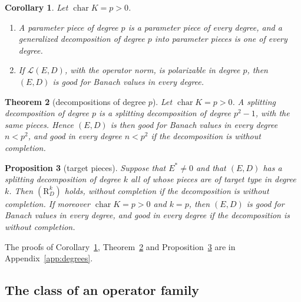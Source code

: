\documentclass[11pt]{amsart}
\newtheorem{theorem}{Theorem}[section]
\newtheorem{proposition}[theorem]{Proposition}
\newtheorem{corollary}[theorem]{Corollary}
\theoremstyle{definition}
\theoremstyle{remark}
\numberwithin{equation}{section}
\newcommand{\cL}{\mathcal L}
\theoremstyle{plain}
\theoremstyle{definition}
\theoremstyle{plain}
\begin{document}
\begin{corollary}\label{cmb:cor:parameter-degrees}
Let $\operatorname{char}K=p>0$.
\begin{enumerate}
\item A parameter piece of degree $p$ is a parameter piece of every degree, and a generalized decomposition of degree $p$
into parameter pieces is one of every degree.
\item If $\cL(E,D)$, with the operator norm, is polarizable in degree $p$, then $(E,D)$ is good for Banach values in every
degree.
\end{enumerate}
\end{corollary}

\begin{theorem}[decompositions of degree $p$]\label{cmb:thm:mixed-degrees}
Let $\operatorname{char}K=p>0$. A splitting decomposition of degree $p$ is a splitting decomposition of degree $p^2-1$, with
the same pieces. Hence $(E,D)$ is then good for Banach values in every degree $n<p^2$, and good in every degree $n<p^2$ if
the decomposition is without completion.
\end{theorem}

\begin{proposition}[target pieces]\label{cmb:prop:target-pieces}
Suppose that $E^*\ne0$ and that $(E,D)$ has a splitting decomposition of degree $k$ all of whose pieces are of target type
in degree $k$. Then $(\mathrm R^k_D)$ holds, without completion if the decomposition is without completion. If moreover
$\operatorname{char}K=p>0$ and $k=p$, then $(E,D)$ is good for Banach values in every degree, and good in every degree if
the decomposition is without completion.
\end{proposition}

The proofs of Corollary~\ref{cmb:cor:parameter-degrees}, Theorem~\ref{cmb:thm:mixed-degrees} and
Proposition~\ref{cmb:prop:target-pieces} are in Appendix~\ref{app:degrees}.

\subsection{The class of an operator family}\label{cmb:ssec:families}
\end{document}
